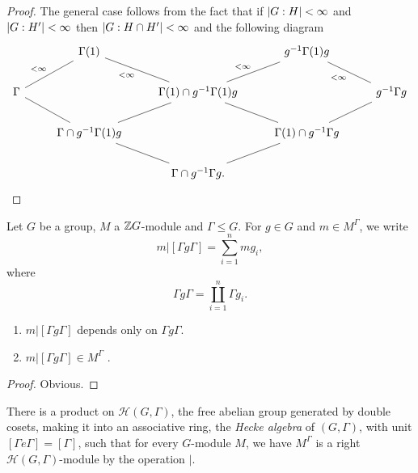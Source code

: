 \documentclass{memoir}
\begin{document}
\begin{proof}
    The general case follows from the fact that if $\lvert G:H\rvert<\infty$ and $\lvert G:H'\rvert<\infty$ then $\lvert G:H\cap H'\rvert<\infty$ and the following diagram
    \begin{equation}
        \begin{tikzcd}
            & \Gamma(1) & & g^{-1}\Gamma(1)g & \\
            \Gamma \arrow[ru,dash,"<\infty"] & & \Gamma(1)\cap g^{-1}\Gamma(1)g \arrow[lu,dash,"<\infty"] \arrow[ru,dash,"<\infty"] & & g^{-1}\Gamma g \arrow[lu,dash,"<\infty"] \\
                   & \Gamma \cap g^{-1}\Gamma(1)g \arrow[lu,dash] \arrow[ru,dash] & & \Gamma(1)\cap g^{-1}\Gamma g \arrow[lu,dash] \arrow[ru,dash] & \\
                   & & \Gamma \cap g^{-1}\Gamma g. \arrow[lu,dash] \arrow[ru,dash] & &
        \end{tikzcd}
    \end{equation}
\end{proof}
\begin{notation}
    Let $G$ be a group, $M$ a $\mathbb{Z} G$-module and $\Gamma\le G$.
    For $g\in G$ and $m\in M^\Gamma$, we write
    \begin{equation}
        m|[\Gamma g \Gamma] = \sum_{i = 1}^nmg_i,
    \end{equation}
    where
    \begin{equation}
        \Gamma g \Gamma = \coprod_{i = 1}^n\Gamma g_i.
    \end{equation}
\end{notation}
\begin{proposition}
    \begin{enumerate}
        \item $m|[\Gamma g\Gamma]$ depends only on $\Gamma g \Gamma$.
        \item $m|[\Gamma g\Gamma]\in M^\Gamma$ .
    \end{enumerate}
\end{proposition}
\begin{proof}
    Obvious.
\end{proof}
\begin{thm}
    There is a product on $\mathcal H(G,\Gamma)$, the free abelian group generated by double cosets, making it into an associative ring, the \textit{Hecke algebra} of $(G,\Gamma)$, with unit $[\Gamma e \Gamma] = [\Gamma ]$, such that for every $G$-module $M$, we have $M^\Gamma$ is a right $\mathcal H(G,\Gamma)$-module by the operation $|$.
\end{thm}
\end{document}
